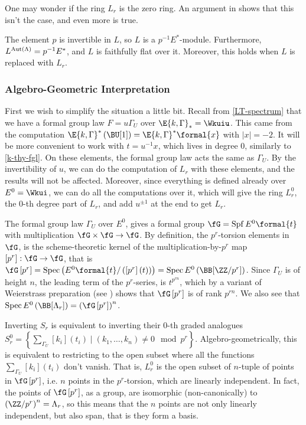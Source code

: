 One may wonder if the ring $L_r$ is the zero ring.
An argument in \cite{HKR} shows that this isn't the case, and even more is true.

\begin{proposition}\label{Lr-fixed-points}
	The element $p$ is invertible in $L$, so $L$ is a $p^{-1} E^*$-module.
	Furthermore, $L^{\operatorname{Aut} \left(\Lambda\right)} = p^{-1} E^*$, and $L$ is faithfully flat over it.
	Moreover, this holds when $L$ is replaced with $L_r$.
\end{proposition}


\subsubsection{Algebro-Geometric Interpretation}\label{alg-geo-Lr}

First we wish to simplify the situation a little bit.
Recall from \ref{LT-spectrum} that we have a formal group law $F = u \Gamma_U$ over $\E{k, \Gamma}_* = \Wkuiu$.
This came from the computation $\E{k, \Gamma}^*\left(\BU[1]\right) = \E{k, \Gamma}^* \formal{x}$ with $\left|x\right| = -2$.
It will be more convenient to work with $t = u^{-1} x$, which lives in degree $0$, similarly to \ref{k-thy-fgl}.
On these elements, the formal group law acts the same as $\Gamma_U$.
By the invertibility of $u$, we can do the computation of $L_r$ with these elements, and the results will not be affected.
Moreover, since everything is defined already over $E^0 = \Wkui$, we can do all the computations over it, which will give the ring $L_r^0$, the $0$-th degree part of $L_r$, and add $u^{\pm 1}$ at the end to get $L_r$.

The formal group law $\Gamma_U$ over $E^0$, gives a formal group $\fG = \spf E^0\formal{t}$ with multiplication $\fG \times \fG \to \fG$.
By definition, the $p^r$-torsion elements in $\fG$, is the scheme-theoretic kernel of the multiplication-by-$p^r$ map $\left[p^r\right]: \fG \to \fG$, that is $\fG\left[p^r\right] = \spec\left(E^0\formal{t}/\left(\left[p^r\right]\left(t\right)\right)\right) = \spec E^0\left(\BB[\ZZ / p^r]\right)$.
Since $\Gamma_U$ is of height $n$, the leading term of the $p^r$-series, is $t^{p^{rn}}$, which by a variant of Weierstrass preparation (see \cite[5.1]{HKR}) shows that $\fG\left[p^r\right]$ is of rank $p^{rn}$.
We also see that $\spec E^0\left(\BB[\Lambda_r]\right) = \left(\fG\left[p^r\right]\right)^n$.

Inverting $S_r$ is equivalent to inverting their $0$-th graded analogues $S_r^0 = \left\{ \sum_{\Gamma_U} [k_i]\left(t_i\right) \mid \left(k_1, \dotsc, k_n\right) \neq 0 \mod p^r\right\}$.
Algebro-geometrically, this is equivalent to restricting to the open subset where all the functions $\sum_{\Gamma_U} [k_i]\left(t_i\right)$ don't vanish.
That is, $L_r^0$ is the open subset of $n$-tuple of points in $\fG\left[p^r\right]$, i.e. $n$ points in the $p^r$-torsion, which are linearly independent.
In fact, the points of $\fG\left[p^r\right]$, as a group, are isomorphic (non-canonically) to $\left(\ZZ/p^r\right)^n = \Lambda_r$, so this means that the $n$ points are not only linearly independent, but also span, that is they form a basis.

